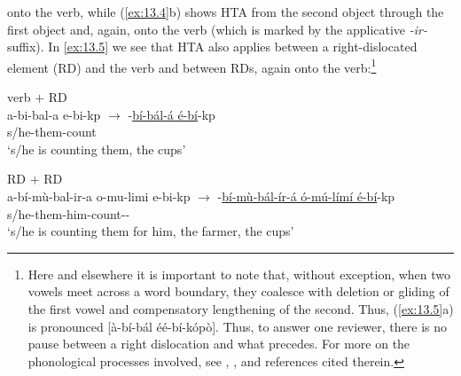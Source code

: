 \documentclass[output=paper]{langsci/langscibook}
\begin{document}
onto the verb, while (\ref{ex:13.4}b) shows \gls{HTA} from the second object
through the first object and, again, onto the verb (which is marked by the
applicative \emph{-ir-} suffix). In \eqref{ex:13.5} we see that \gls{HTA} also
applies between a right-dislocated element (\gls{RD}) and the verb
and between \glspl{RD}, again onto the verb:\footnote{Here and elsewhere it is
    important to note that, without exception, when two vowels meet across a
    word boundary, they coalesce with deletion or gliding of the first vowel
    and compensatory lengthening of the second. Thus, (\ref{ex:13.5}a) is
    pronounced [à-bí-bál éé-bí-kópò]. Thus, to answer one reviewer, there is no
    pause between a right dislocation and what precedes. For more on the
phonological processes involved, see \citet{Clements1986},
\citet{HymanKatamba1999}, and references cited therein.}

\ea\label{ex:13.5}
    \ea verb $+$ RD\\
        a-bi-bal-a  e-bi-kp  ${\rightarrow}$
            -\underline{bí-bál-á é-bí}-kp\\
        s/he{}-them{}-count\\
        ‘s/he is counting them, the cups’
    \ex \gls{RD} $+$ RD\\
        {\footnotesize
        a-bí-mù-bal-ir-a  o-mu-limi  e-bi-kp
            ${\rightarrow}$ -\underline{bí-mù-bál-ír-á  ó-mú-límí
            é-bí}-kp} \\
        {\footnotesize s/he{}-them-him-count-\Appl-\Fv{}} \\
        ‘s/he is counting them for him, the farmer, the cups’
    \z
\z
\end{document}
